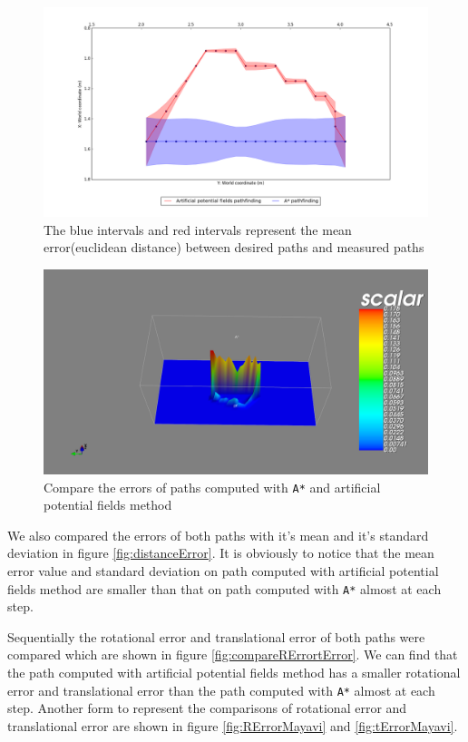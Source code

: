 \begin{figure}[H]
\centering
\includegraphics[scale=0.3]{./fig/comparePathsError.png}
\caption{The blue intervals and red intervals represent the mean error(euclidean distance) between desired paths and measured paths}
\label{fig:comparePathsError}
\end{figure}


\begin{figure}[H]
\centering
\includegraphics[scale=0.3]{./fig/distanceErrorMayavi.png}
\caption{Compare the errors of paths computed with \texttt{A*} and artificial potential fields method}
\label{fig:distanceErrorMayavi}
\end{figure}

We also compared the errors of both paths with it's mean and it's standard deviation in figure \ref{fig:distanceError}. It is obviously to notice that the mean error value and standard deviation on path computed with artificial potential fields method are smaller than that on path computed with \texttt{A*} almost at each step. 

Sequentially the rotational error and translational error of both paths were compared which are shown in figure \ref{fig:compareRErrortError}. We can find that the path computed with artificial potential fields method has a smaller rotational error and translational error than the path computed with \texttt{A*} almost at each step. Another form to represent the comparisons of rotational error and translational error are shown in figure \ref{fig:RErrorMayavi} and \ref{fig:tErrorMayavi}.

